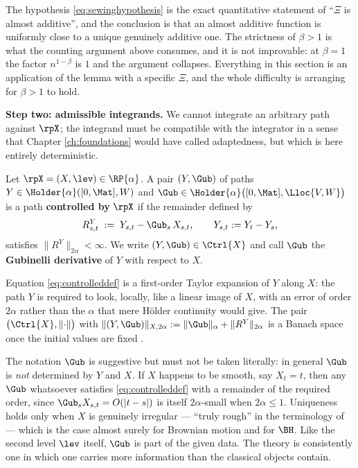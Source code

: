 \medskip

The hypothesis \eqref{eq:sewinghypothesis} is the exact quantitative statement of ``$\Xi$ is almost
additive'', and the conclusion is that an almost additive function is uniformly close to a unique
genuinely additive one. The strictness of $\beta>1$ is what the counting argument above consumes,
and it is not improvable: at $\beta=1$ the factor $n^{1-\beta}$ is $1$ and the argument collapses.
Everything in this section is an application of the lemma with a specific $\Xi$, and the whole
difficulty is arranging for $\beta>1$ to hold.

\medskip

\noindent\textbf{Step two: admissible integrands.} We cannot integrate an arbitrary path against
$\rpX$; the integrand must be compatible with the integrator in a sense that Chapter \ref{ch:foundations}
would have called adaptedness, but which is here entirely deterministic.

\begin{definition}\label{def:controlled}
Let $\rpX = (X,\lev)\in\RP{\alpha}$. A pair $(Y,\Gub)$ of paths
$Y \in \Holder{\alpha}([0,\Mat],W)$ and
$\Gub \in \Holder{\alpha}\bigl([0,\Mat],\Lloc{V,W}\bigr)$ is a path \textbf{controlled by} $\rpX$ if
the remainder defined by
\begin{equation}\label{eq:controlleddef}
R^{Y}_{s,t} \;:=\; Y_{s,t} - \Gub_s\,X_{s,t}, \qquad Y_{s,t} := Y_t - Y_s,
\end{equation}
satisfies $\lVert R^Y\rVert_{2\alpha} < \infty$. We write $(Y,\Gub) \in \Ctrl{X}$ and call $\Gub$
the \textbf{Gubinelli derivative} of $Y$ with respect to $X$.
\end{definition}

Equation \eqref{eq:controlleddef} is a first-order Taylor expansion of $Y$ along $X$: the path $Y$
is required to look, locally, like a linear image of $X$, with an error of order $2\alpha$ rather
than the $\alpha$ that mere Hölder continuity would give. The pair $\bigl(\Ctrl{X}, \lVert\cdot\rVert\bigr)$
with $\lVert (Y,\Gub)\rVert_{X,2\alpha} := \lVert \Gub\rVert_\alpha + \lVert R^Y\rVert_{2\alpha}$ is
a Banach space once the initial values are fixed \cite[Ch.\ 4]{frizhairer2020}.

\begin{remark}\label{rem:gubinellinotunique}
The notation $\Gub$ is suggestive but must not be taken literally: in general $\Gub$ is \emph{not}
determined by $Y$ and $X$. If $X$ happens to be smooth, say $X_t = t$, then any $\Gub$ whatsoever
satisfies \eqref{eq:controlleddef} with a remainder of the required order, since
$\Gub_s X_{s,t} = O(|t-s|)$ is itself $2\alpha$-small when $2\alpha \leq 1$. Uniqueness holds only
when $X$ is genuinely irregular --- ``truly rough'' in the terminology of \cite[Ch.\ 6]{frizhairer2020}
--- which is the case almost surely for Brownian motion and for $\BH$. Like the second level $\lev$
itself, $\Gub$ is part of the given data. The theory is consistently one in which one carries more
information than the classical objects contain.
\end{remark}


